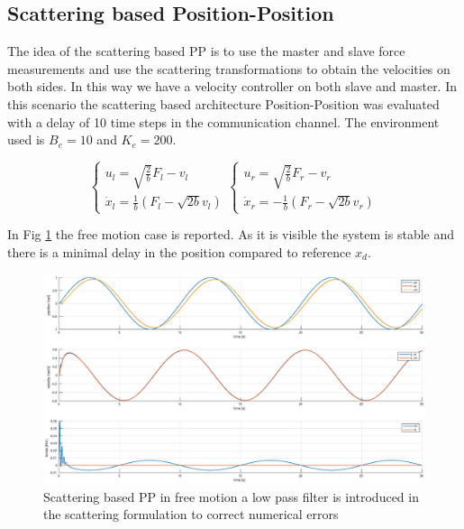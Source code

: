 \documentclass[a4paper,12pt]{article}
\begin{document}
\newpage

\subsection{Scattering based Position-Position}

The idea of the scattering based PP is to use the master and slave force measurements and use the scattering transformations to obtain the velocities on both sides. In this way we have a velocity controller on both slave and master. In this scenario the scattering based architecture Position-Position was evaluated with a delay of 10 time steps in the communication channel. The environment used is $B_e = 10$ and $K_e = 200$. 

\[
    \begin{cases}
    u_l=\sqrt{\frac{2}{b}}F_l-v_l\\
    \dot{x}_l = \frac{1}{b}(F_l-\sqrt{2b}v_l)
    \end{cases}
    \begin{cases}
    u_r=\sqrt{\frac{2}{b}}F_r-v_r\\
    \dot{x}_r=-\frac{1}{b}(F_r-\sqrt{2b}v_r)
    \end{cases}
\]

\bigskip
In Fig \ref{fig:scat_pp_free} the free motion case is reported. As it is visible the system is stable and there is a minimal delay in the position compared to reference $x_d$.

\begin{figure}[H]
    \begin{center}
        \hspace*{-4.5cm}
        \includegraphics[scale=0.5]{images/scat_pp_free.eps}
    \end{center}
    \caption{Scattering based PP in free motion a low pass filter is introduced in the scattering formulation to correct numerical errors}
    \label{fig:scat_pp_free}
\end{figure}
\end{document}
